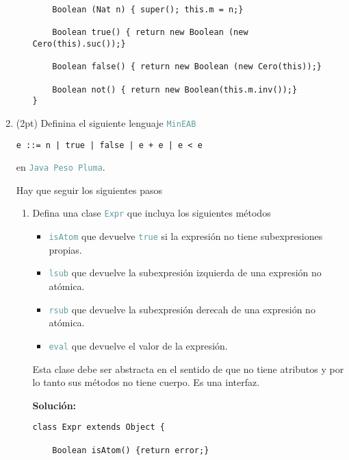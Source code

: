 \documentclass{article}
\newcommand{\tp}[1]{\textcolor{CadetBlue} {\texttt{#1}}}
\newcommand{\tb}[1]{\textcolor{RoyalPurple} {\textbf{#1}}}
\newcommand{\pt}[1]{\textcolor{RoyalPurple}{(#1pt)}}
\begin{document}
\begin{enumerate}
\begin{enumerate}
\begin{verbatim}
    Boolean (Nat n) { super(); this.m = n;}

    Boolean true() { return new Boolean (new Cero(this).suc());}

    Boolean false() { return new Boolean (new Cero(this));}

    Boolean not() { return new Boolean(this.m.inv());}
}
            \end{verbatim}
        \end{enumerate}

        \item \pt{2} Definina el siguiente lenguaje \tp{MinEAB}

        \begin{verbatim}
e ::= n | true | false | e + e | e < e
        \end{verbatim}

        en \tp{Java Peso Pluma}.

        Hay que seguir los siguientes pasos

        \begin{enumerate}
            \item Defina una clase \tp{Expr} que incluya los siguientes métodos

            \begin{itemize}
                \item \tp{isAtom} que devuelve \tp{true} si la expresión no
                tiene subexpresiones propias.

                \item \tp{lsub} que devuelve la subexpresión izquierda de una
                expresión no atómica.

                \item \tp{rsub} que devuelve la subexpresión derecah de una
                expresión no atómica.

                \item \tp{eval} que devuelve el valor de la expresión.
            \end{itemize}

            Esta clase debe ser abstracta en el sentido de que no tiene
            atributos y por lo tanto sus métodos no tiene cuerpo. Es una
            interfaz.

            \tb{Solución:}

            \begin{verbatim}
class Expr extends Object {

    Boolean isAtom() {return error;}


\end{verbatim}
\end{enumerate}
\end{enumerate}
\end{document}
